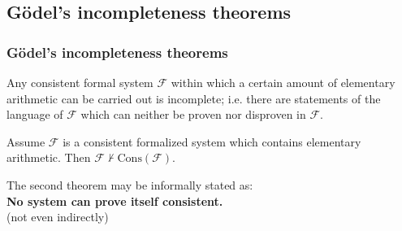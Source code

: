 \subsection{Gödel's incompleteness theorems}
\begin{frame}
  \frametitle{Gödel's incompleteness theorems}

  \begin{theorem}
    Any consistent formal system $\mathcal{F}$ within which a certain amount of elementary arithmetic can be carried out is incomplete; i.e. there are statements of the language of $\mathcal{F}$ which can neither be proven nor disproven in $\mathcal{F}$.
  \end{theorem}
  \pause
  \begin{theorem}
    Assume $\mathcal{F}$ is a consistent formalized system which contains elementary arithmetic. Then $\mathcal{F} \not \vdash \text{Cons}(\mathcal{F})$.
  \end{theorem}

  \pause
  \begin{center}
    The second theorem may be informally stated as:\\
    \textbf{No system can prove itself consistent.}\\
    \tiny{(not even indirectly)}
  \end{center}
\end{frame}



